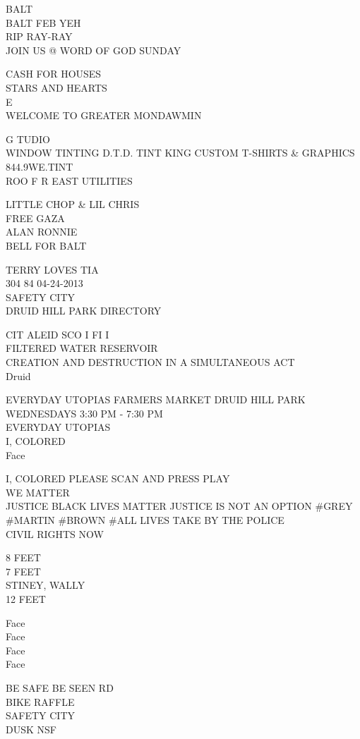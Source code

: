 \documentclass[10pt,letterpaper]{article}
\begin{document}
BALT\\
BALT FEB YEH\\
RIP RAY{-}RAY\\
JOIN US @ WORD OF GOD SUNDAY

CASH FOR HOUSES\\
STARS AND HEARTS\\
E\\
WELCOME TO GREATER MONDAWMIN

G TUDIO\\
WINDOW TINTING D.T.D. TINT KING CUSTOM T{-}SHIRTS \& GRAPHICS\\
844.9WE.TINT\\
ROO F R EAST UTILITIES

LITTLE CHOP \& LIL CHRIS\\
FREE GAZA\\
ALAN RONNIE\\
BELL FOR BALT

TERRY LOVES TIA\\
304 84 04{-}24{-}2013\\
SAFETY CITY\\
DRUID HILL PARK DIRECTORY

CIT ALEID SCO I FI I\\
FILTERED WATER RESERVOIR\\
CREATION AND DESTRUCTION IN A SIMULTANEOUS ACT\\
Druid

EVERYDAY UTOPIAS FARMERS MARKET DRUID HILL PARK WEDNESDAYS 3:30 PM {-} 7:30 PM\\
EVERYDAY UTOPIAS\\
I, COLORED\\
Face

I, COLORED PLEASE SCAN AND PRESS PLAY\\
WE MATTER\\
JUSTICE BLACK LIVES MATTER JUSTICE IS NOT AN OPTION \#GREY \#MARTIN \#BROWN \#ALL LIVES TAKE BY THE POLICE\\
CIVIL RIGHTS NOW

8 FEET\\
7 FEET\\
STINEY, WALLY\\
12 FEET

Face\\
Face\\
Face\\
Face

BE SAFE BE SEEN RD\\
BIKE RAFFLE\\
SAFETY CITY\\
DUSK NSF
\end{document}
